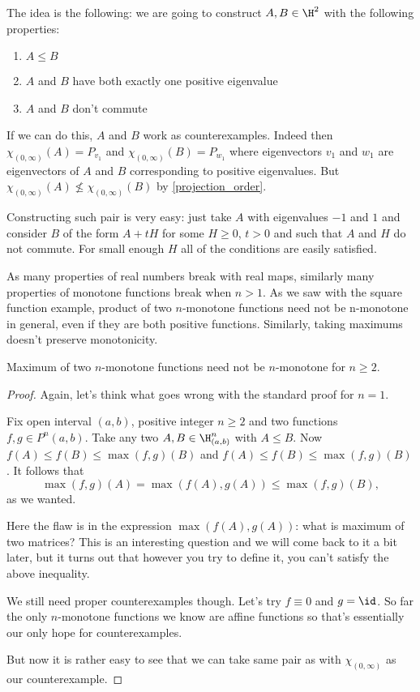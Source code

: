 The idea is the following: we are going to construct $A, B \in \H^{2}$ with the following properties:
\begin{enumerate}
	\item $A \leq B$
	\item $A$ and $B$ have both exactly one positive eigenvalue
	\item $A$ and $B$ don't commute
\end{enumerate}
If we can do this, $A$ and $B$ work as counterexamples. Indeed then $\chi_{(0, \infty)}(A) = P_{v_{1}}$ and $\chi_{(0, \infty)}(B) = P_{w_{1}}$ where eigenvectors $v_{1}$ and $w_{1}$ are eigenvectors of $A$ and $B$ corresponding to positive eigenvalues. But $\chi_{(0, \infty)}(A) \not\leq \chi_{(0, \infty)}(B)$ by \ref{projection_order}.

Constructing such pair is very easy: just take $A$ with eigenvalues $-1$ and $1$ and consider $B$ of the form $A + t H$ for some $H \geq 0$, $t > 0$ and such that $A$ and $H$ do not commute. For small enough $H$ all of the conditions are easily satisfied.

As many properties of real numbers break with real maps, similarly many properties of monotone functions break when $n > 1$. As we saw with the square function example, product of two $n$-monotone functions need not be n-monotone in general, even if they are both positive functions. Similarly, taking maximums doesn't preserve monotonicity.

\begin{prop}
	Maximum of two $n$-monotone functions need not be $n$-monotone for $n \geq 2$.
\end{prop}
\begin{proof}
	Again, let's think what goes wrong with the standard proof for $n = 1$.

	Fix open interval $(a, b)$, positive integer $n \geq 2$ and two functions $f, g \in P^{n}(a, b)$. Take any two $A, B \in \H_{(a, b)}^{n}$ with $A \leq B$. Now $f(A) \leq f(B) \leq \max(f, g)(B)$ and $f(A) \leq f(B) \leq \max(f, g)(B)$. It follows that
	\[
		\max(f, g)(A) = \max(f(A), g(A)) \leq \max(f, g)(B),
	\]
	as we wanted.

	Here the flaw is in the expression $\max(f(A), g(A))$: what is maximum of two matrices? This is an interesting question and we will come back to it a bit later, but it turns out that however you try to define it, you can't satisfy the above inequality.

	We still need proper counterexamples though. Let's try $f \equiv 0$ and $g = \id$. So far the only $n$-monotone functions we know are affine functions so that's essentially our only hope for counterexamples.

	But now it is rather easy to see that we can take same pair as with $\chi_{(0, \infty)}$ as our counterexample.
\end{proof}

